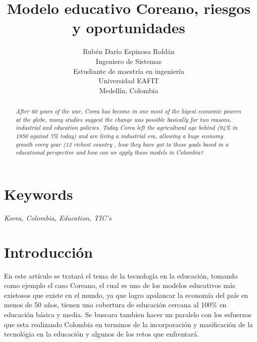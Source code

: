 \documentclass[conference]{IEEEtran}
\begin{document}
%
\title{\Large\bf Modelo educativo Coreano, riesgos y oportunidades}


\author{Rubén Darío Espinosa Roldán  \\
  Ingeniero de Sistemas\\
  Estudiante de maestría en ingeniería\\
  Universidad EAFIT  \\
  Medellín, Colombia}

\maketitle

\begin{abstract}
\em
After 60 years of the war, Corea has become in one most of the higest economic powers at the globe, many studies suggest the change was possible basically for two reasons, industrial and education policies. Today Corea left the agricultural age behind (94\% in 1950 against 7\% today) and are living a industrial era, allowing a huge economy growth every year (12 richest country \cite{korea:rich}, how they have got to those goals based in a educational perspective and how can we apply those models in Colombia? 
\end{abstract}

\section*{Keywords}
\emph{
Korea, Colombia, Education, TIC's
}

\section{Introducción}
En este artículo se tratará el tema de la tecnología en la educación, tomando como ejemplo el caso Coreano, el cual es uno de los modelos educativos más existosos que existe en el mundo, ya que logro apalancar la economía del país en menos de 50 años, tienen una cobertura de educación cercana al 100\% en educación básica y media. Se buscara tambien hacer un paralelo con los esfuerzos que esta realizando Colombia en terminos de la incorporación y masificación de la tecnológia en la educación y algunos de los retos que enfrentará. 
\end{document}
